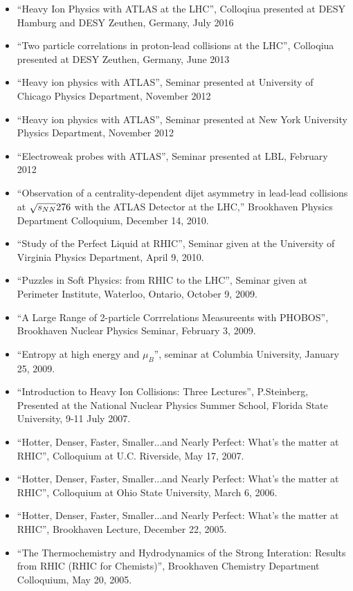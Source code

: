 \documentclass[11 pt]{article}
\begin{document}
\begin{description}
\begin{itemize}
\item ``Heavy Ion Physics with ATLAS at the LHC'', Colloqiua presented at DESY Hamburg and DESY Zeuthen, Germany, July 2016
\item ``Two particle correlations in proton-lead collisions at the LHC'', Colloqiua presented at DESY Zeuthen, Germany, June 2013
\item ``Heavy ion physics with ATLAS'', Seminar presented at University of Chicago Physics Department, November 2012
\item ``Heavy ion physics with ATLAS'', Seminar presented at New York University Physics Department, November 2012
\item ``Electroweak probes with ATLAS'', Seminar presented at LBL, February 2012
\item ``Observation of a centrality-dependent dijet asymmetry in lead-lead collisions at $\sqrt{s_{NN}}276$ with the ATLAS Detector at the LHC,'' Brookhaven Physics Department Colloquium, December 14, 2010.
\item ``Study of the Perfect Liquid at RHIC'', Seminar given at the University of Virginia Physics Department, April 9, 2010.
\item ``Puzzles in Soft Physics: from RHIC to the LHC'', Seminar given at Perimeter Institute, Waterloo, Ontario, October 9, 2009.
\item ``A Large Range of 2-particle Corrrelations Measureents with PHOBOS'', Brookhaven Nuclear Physics Seminar, February 3, 2009.
\item ``Entropy at high energy and $\mu_B$'', seminar at Columbia University, January 25, 2009.
\item ``Introduction to Heavy Ion Collisions: Three Lectures'', P.Steinberg, Presented at the National Nuclear Physics Summer School, Florida State University, 9-11 July 2007.
\item ``Hotter, Denser, Faster, Smaller...and Nearly Perfect: What's the matter at RHIC'', Colloquium at U.C. Riverside, May 17, 2007.
\item ``Hotter, Denser, Faster, Smaller...and Nearly Perfect: What's the matter at RHIC'', Colloquium at Ohio State University, March 6, 2006.
\item ``Hotter, Denser, Faster, Smaller...and Nearly Perfect: What's the matter at RHIC'', Brookhaven Lecture, December 22, 2005.
\item ``The Thermochemistry and Hydrodynamics of the Strong Interation: Results from RHIC (RHIC for Chemists)'', Brookhaven Chemistry Department Colloquium, May 20, 2005.

\end{itemize}
\end{description}
\end{document}
